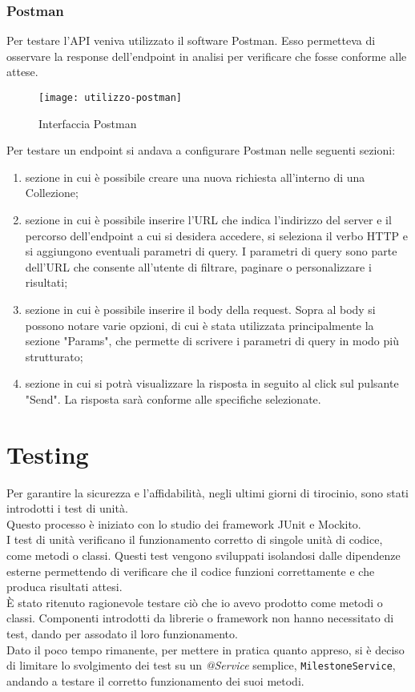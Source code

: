 \subsubsection{Postman}
Per testare l'API veniva utilizzato il software Postman. Esso permetteva di osservare la response dell'endpoint in analisi per verificare che fosse conforme alle attese.\\

\begin{figure}[H] 
    \centering 
    \texttt{[image: utilizzo-postman]} 
    \caption{Interfaccia Postman}
\end{figure}
\noindent Per testare un endpoint si andava a configurare Postman nelle seguenti sezioni:
\begin{enumerate}
\item sezione in cui è possibile creare una nuova richiesta all'interno di una Collezione;
\item sezione in cui è possibile inserire l'URL che indica l'indirizzo del server e il percorso dell'endpoint a cui si desidera accedere, si seleziona il verbo HTTP e si aggiungono eventuali parametri di query. I parametri di query sono parte dell'URL che consente all'utente di filtrare, paginare o personalizzare i risultati;
\item sezione in cui è possibile inserire il body della request. Sopra al body si possono notare varie opzioni, di cui è stata utilizzata principalmente la sezione "Params", che permette di scrivere i parametri di query in modo più strutturato;
\item sezione in cui si potrà visualizzare la risposta in seguito al click sul pulsante "Send". La risposta sarà conforme alle specifiche selezionate.
\end{enumerate}

\section{Testing}
Per garantire la sicurezza e l’affidabilità, negli ultimi giorni di tirocinio, sono stati introdotti i test di unità.\\
Questo processo è iniziato con lo studio dei framework JUnit e Mockito.\\
I test di unità verificano il funzionamento corretto di singole unità di codice, come metodi o classi. Questi test vengono sviluppati isolandosi dalle dipendenze esterne permettendo di verificare che il codice funzioni correttamente e che produca risultati attesi.\\
È stato ritenuto ragionevole testare ciò che io avevo prodotto come metodi o classi. Componenti introdotti da librerie o framework non hanno necessitato di test, dando per assodato il loro funzionamento.\\
Dato il poco tempo rimanente, per mettere in pratica quanto appreso, si è deciso di limitare lo svolgimento dei test su un \textit{@Service} semplice, \texttt{MilestoneService}, andando a testare il corretto funzionamento dei suoi metodi.

